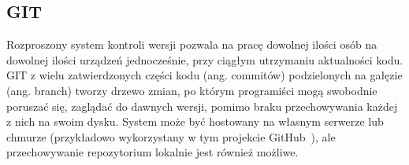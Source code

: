 \subsection{GIT}
Rozproszony system kontroli wersji pozwala na pracę dowolnej ilości osób na dowolnej ilości urządzeń jednocześnie, 
przy ciągłym utrzymaniu aktualności kodu.
GIT z wielu zatwierdzonych części kodu (ang. commitów) podzielonych na gałęzie (ang. branch) tworzy drzewo zmian, 
po którym programiści mogą swobodnie 
poruszać się, zaglądać do dawnych wersji, pomimo braku przechowywania każdej z nich na swoim dysku.
System może być hostowany na własnym serwerze lub chmurze (przykładowo wykorzystany w tym projekcie 
GitHub~\cite{github,Halaczkiewicz_SMCEBI_Navigator_GitHub}), 
ale przechowywanie repozytorium lokalnie jest również możliwe.
